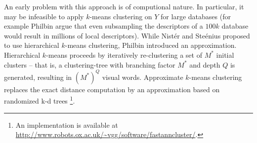 
An early problem with this approach is of computional nature. In particular, it may be infeasible to apply $k$-means clustering on $Y$ for large databases (for example Philbin \etal \cite{PhilbinChumIsardSivicZisserman:2007} argue that even subsampling the descriptors of a $100k$ database would result in millions of local descriptors). While Nist{\'e}r and Ste{\'e}nius \cite{NisterStewenius:2006} proposed to use hierarchical $k$-means clustering, Philbin \etal \cite{PhilbinChumIsardSivicZisserman:2007} introduced an approximation. Hierarchical $k$-means proceeds by iteratively re-clustering a set of $M^\ast$ initial clusters -- that is, a clustering-tree with branching factor $M^\ast$ and depth $Q$ is generated, resulting in $(M^\ast)^Q$ visual words. Approximate $k$-means clustering replaces the exact distance computation by an approximation based on randomized k-d trees
\footnote{
    An implementation is available at \url{http://www.robots.ox.ac.uk/~vgg/software/fastanncluster/}.
}.

